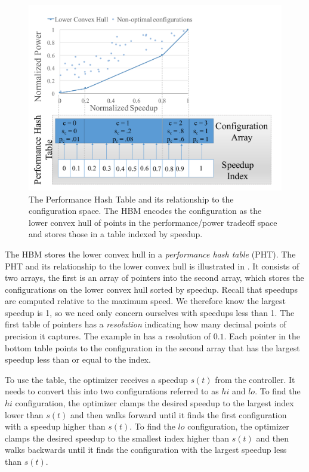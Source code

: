 \begin{figure}
  \includegraphics[width=\columnwidth]{figures/performance-hash-table.pdf}
  \caption{The Performance Hash Table and its relationship to the
    configuration space.  The HBM encodes the configuration as the
    lower convex hull of points in the performance/power tradeoff
    space and stores those in a table indexed by speedup.}
  \label{fig:pht}
\end{figure}

The HBM stores the lower convex hull in a \emph{performance hash
  table} (PHT).  The PHT and its relationship to the lower convex hull
is illustrated in .  It consists of two arrays, the first
is an array of pointers into the second array, which stores the
configurations on the lower convex hull sorted by speedup.  Recall
that speedups are computed relative to the maximum speed.  We
therefore know the largest speedup is 1, so we need only concern
ourselves with speedups less than 1.  The first table of pointers has
a \emph{resolution} indicating how many decimal points of precision it
captures.  The example in  has a resolution of $0.1$.
Each pointer in the bottom  table points to the configuration in the
second array that has the largest speedup less than or equal to the
index.

To use the table, the optimizer receives a speedup $s(t)$ from the
controller.  It needs to convert this into two configurations referred
to as $hi$ and $lo$.  To find the $hi$ configuration, the optimizer
clamps the desired speedup to the largest index lower than $s(t)$ and
then walks forward until it finds the first configuration with a
speedup higher than $s(t)$.  To find the $lo$ configuration, the
optimizer clamps the desired speedup to the smallest index higher than
$s(t)$ and then walks backwards until it finds the configuration with
the largest speedup less than $s(t)$.

